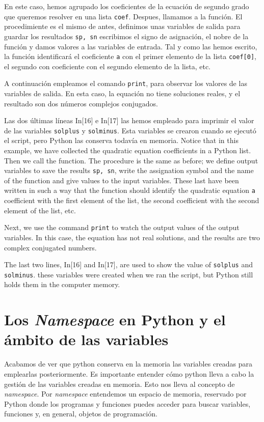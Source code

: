 \begin{paracol}{2}
En este caso, hemos agrupado los coeficientes de la ecuación de segundo grado que queremos resolver en una lista \texttt{coef}. Despues, llamamos a la función. El procedimiente es el mismo de antes, definimos unas variables de salida para guardar los resultados \texttt{sp, sn} escribimos el signo de asignación, el nobre de la función y damos valores a las variables de entrada. Tal y como las hemos escrito, la función identificará el coeficiente \texttt{a} con el primer elemento de la lista \texttt{coef[0]}, el segundo con coeficiente con el segundo elemento de la lista, etc.

A continuación empleamos el comando \texttt{print}, para observar los valores de las variables de salida. En esta caso, la equación no tiene soluciones reales, y el resultado son dos números complejos conjugados.

Las dos últimas líneas In[16] e In[17] las hemos empleado para imprimir el valor de las variables \texttt{solplus} y \texttt{solminus}. Esta variables se crearon cuando se ejecutó el script, pero Python las conserva todavía en memoria.
\switchcolumn
Notice that in this example, we have collected the quadratic equation coefficients in a Python list. Then we call the function. The procedure is the same as before; we define output variables to save the results \texttt{sp, sn}, write the assignation symbol and the name of the function and give values to the input variables. These last have been written in such a way that the function should identify the quadratic equation \texttt{a} coefficient with the first element of the list, the second coefficient with the second element of the list, etc. 

Next, we use the command \texttt{print} to watch the output values of the output variables. In this case, the equation has not real solutions, and the results are two complex conjugated numbers.

The last two lines, In[16] and In[17], are used to show the value of \texttt{solplus} and \texttt{solminus}. these variables were created when we ran the script, but Python still holds them in the computer memory. 
\switchcolumn
\section{Los \emph{Namespace} en Py\-thon y el ámbito de las variables} 
Acabamos de ver que python conserva en la memoria las variables creadas para emplearlas posteriormente. Es importante entender cómo python lleva a cabo la gestión de las variables creadas en memoria. Esto nos lleva al concepto de \emph{namespace}.
Por \emph{namespace} entendemos un espacio de memoria, reservado por Python donde los programas y funciones puedes acceder para buscar variables, funciones y, en general, objetos de programación.


\end{paracol}
